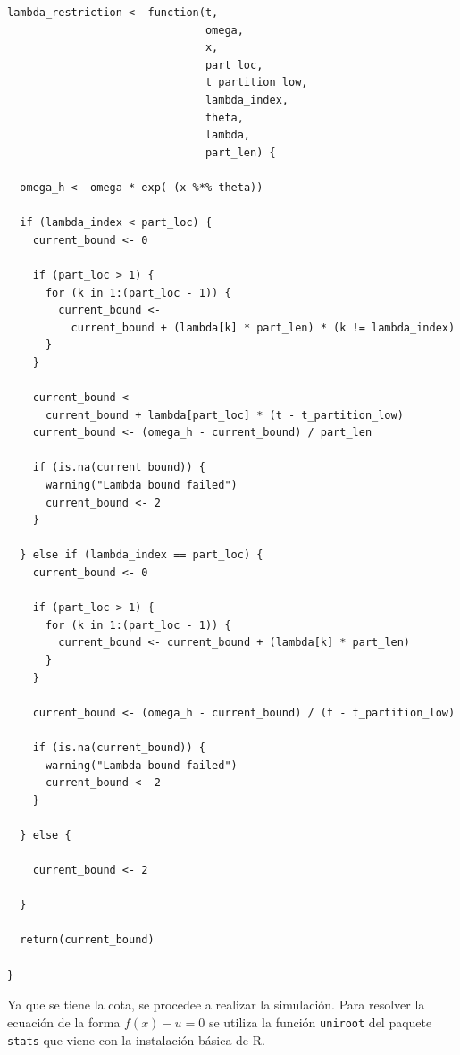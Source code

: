\documentclass[11pt,a4paper]{article}
\begin{document}
\begin{lstlisting}
lambda_restriction <- function(t,
                               omega,
                               x,
                               part_loc,
                               t_partition_low,
                               lambda_index,
                               theta,
                               lambda,
                               part_len) {

  omega_h <- omega * exp(-(x %*% theta))

  if (lambda_index < part_loc) {
    current_bound <- 0

    if (part_loc > 1) {
      for (k in 1:(part_loc - 1)) {
        current_bound <-
          current_bound + (lambda[k] * part_len) * (k != lambda_index)
      }
    }

    current_bound <-
      current_bound + lambda[part_loc] * (t - t_partition_low)
    current_bound <- (omega_h - current_bound) / part_len

    if (is.na(current_bound)) {
      warning("Lambda bound failed")
      current_bound <- 2
    }

  } else if (lambda_index == part_loc) {
    current_bound <- 0

    if (part_loc > 1) {
      for (k in 1:(part_loc - 1)) {
        current_bound <- current_bound + (lambda[k] * part_len)
      }
    }

    current_bound <- (omega_h - current_bound) / (t - t_partition_low)

    if (is.na(current_bound)) {
      warning("Lambda bound failed")
      current_bound <- 2
    }

  } else {

    current_bound <- 2

  }

  return(current_bound)

}
\end{lstlisting}\leavevmode\newline

Ya que se tiene la cota, se procedee a realizar la simulación. Para resolver la ecuación de la forma $f(x) - u = 0$ se utiliza la función \texttt{uniroot} del paquete \texttt{stats} que viene con la instalación básica de R.\\
\end{document}
